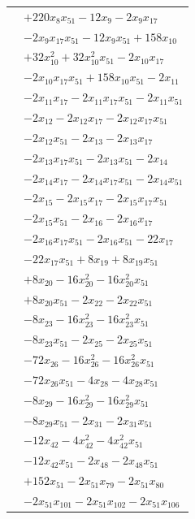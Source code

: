 \begin{longtable}{@{}r@{\;}l@{}}
 & \(\displaystyle +220x_{8}x_{51} -12x_{9} -2x_{9}x_{17}\) \\
 & \(\displaystyle -2x_{9}x_{17}x_{51} -12x_{9}x_{51} +158x_{10}\) \\
 & \(\displaystyle +32x_{10}^{2} +32x_{10}^{2}x_{51} -2x_{10}x_{17}\) \\
 & \(\displaystyle -2x_{10}x_{17}x_{51} +158x_{10}x_{51} -2x_{11}\) \\
 & \(\displaystyle -2x_{11}x_{17} -2x_{11}x_{17}x_{51} -2x_{11}x_{51}\) \\
 & \(\displaystyle -2x_{12} -2x_{12}x_{17} -2x_{12}x_{17}x_{51}\) \\
 & \(\displaystyle -2x_{12}x_{51} -2x_{13} -2x_{13}x_{17}\) \\
 & \(\displaystyle -2x_{13}x_{17}x_{51} -2x_{13}x_{51} -2x_{14}\) \\
 & \(\displaystyle -2x_{14}x_{17} -2x_{14}x_{17}x_{51} -2x_{14}x_{51}\) \\
 & \(\displaystyle -2x_{15} -2x_{15}x_{17} -2x_{15}x_{17}x_{51}\) \\
 & \(\displaystyle -2x_{15}x_{51} -2x_{16} -2x_{16}x_{17}\) \\
 & \(\displaystyle -2x_{16}x_{17}x_{51} -2x_{16}x_{51} -22x_{17}\) \\
 & \(\displaystyle -22x_{17}x_{51} +8x_{19} +8x_{19}x_{51}\) \\
 & \(\displaystyle +8x_{20} -16x_{20}^{2} -16x_{20}^{2}x_{51}\) \\
 & \(\displaystyle +8x_{20}x_{51} -2x_{22} -2x_{22}x_{51}\) \\
 & \(\displaystyle -8x_{23} -16x_{23}^{2} -16x_{23}^{2}x_{51}\) \\
 & \(\displaystyle -8x_{23}x_{51} -2x_{25} -2x_{25}x_{51}\) \\
 & \(\displaystyle -72x_{26} -16x_{26}^{2} -16x_{26}^{2}x_{51}\) \\
 & \(\displaystyle -72x_{26}x_{51} -4x_{28} -4x_{28}x_{51}\) \\
 & \(\displaystyle -8x_{29} -16x_{29}^{2} -16x_{29}^{2}x_{51}\) \\
 & \(\displaystyle -8x_{29}x_{51} -2x_{31} -2x_{31}x_{51}\) \\
 & \(\displaystyle -12x_{42} -4x_{42}^{2} -4x_{42}^{2}x_{51}\) \\
 & \(\displaystyle -12x_{42}x_{51} -2x_{48} -2x_{48}x_{51}\) \\
 & \(\displaystyle +152x_{51} -2x_{51}x_{79} -2x_{51}x_{80}\) \\
 & \(\displaystyle -2x_{51}x_{101} -2x_{51}x_{102} -2x_{51}x_{106}\) \\

\end{longtable}
